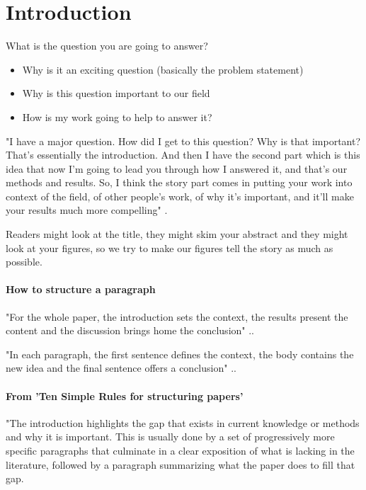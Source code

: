 \section*{Introduction}


What is the question you are going to answer?
\begin{itemize}
    \item Why is it an exciting question (basically the problem statement)
    \item Why is this question important to our field
    \item How is my work going to help to answer it?
\end{itemize}

"I have a major question. How did I get to this question? Why is that important? That’s essentially the introduction. And then I have the second part which is this idea that now I’m going to lead you through how I answered it, and that’s our methods and results. So, I think the story part comes in putting your work into context of the field, of other people’s work, of why it’s important, and it’ll make your results much more compelling" \cite{mensh2017ten}. 


Readers might look at the title, they might skim your abstract and they might look at your figures, so we try to make our figures tell the story as much as possible.


\paragraph{How to structure a paragraph}
"For the whole paper, the introduction sets the context, the results present the content and the discussion brings home the conclusion" \cite{mensh2017ten}..

"In each paragraph, the first sentence defines the context, the body contains the new idea and the final sentence offers a conclusion" \cite{mensh2017ten}..




\paragraph{From 'Ten Simple Rules for structuring papers'}
"The introduction highlights the gap that exists in current knowledge or methods and why it is important. This is usually done by a set of progressively more specific paragraphs that culminate in a clear exposition of what is lacking in the literature, followed by a paragraph summarizing what the paper does to fill that gap.

